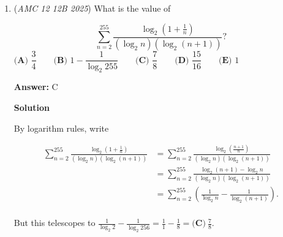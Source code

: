 \begin{enumerate}
 



\textbf{Solution 2 (Trial and Error)}

A number is divisible by $36$ if it divisible by $4$, and $9$. The divisibility rule for $4$ requires the last 2 digits to also be a multiple of $4$. The divisibility rule for 9 requires the sum of all digits to be divisible by $9$. Using the first condition $A+B$ is a multiple of 4. We can list out all possibilities for this, since both $A$ and $B$ are digits. The possibilities are  $(1,2),(1,6),...(9,6)$ for $B$ and $A$ respectively. There are a total of $2$ digits that are $A$'s and $3$ that are $B$'s. So if the digits sum to $9$, then $2A+3B$ is a multiple of 9. We can try plugging in numbers from our list earlier into the equation $2A+3B$ to find what values set the expression equal to a multiple of $9$. By trying numbers $A=6$, and $B=5$. So then $A+B$ yields 

 $6+5=\boxed{\textbf{(C)}~11}$.

 


	\item (\textit{AMC 12 12B 2025}) What is the value of 


 
 \[\sum_{n=2}^{255} \frac{\log_2(1+\frac{1}{n})}{(\log_2 n)(\log_2(n+1))}?\]
$\textbf{(A) } \dfrac{3}{4} \qquad\textbf{(B) } 1-\dfrac{1}{\log_2 255} \qquad\textbf{(C) } \dfrac{7}{8} \qquad\textbf{(D) } \dfrac{15}{16} \qquad\textbf{(E) } 1$

 \textbf{Answer: }C



\textbf{Solution}

By logarithm rules, write

 \begin{align}\sum_{n = 2}^{255}\frac{\log_{2}\left(1 + \frac{1}{n}\right)}{\left(\log_{2}n\right)\left(\log_{2}(n + 1)\right)}&=\sum_{n = 2}^{255}\frac{\log_{2}\left(\frac{n+1}{n}\right)}{\left(\log_{2}n\right)\left(\log_{2}(n + 1)\right)}\\&=\sum_{n = 2}^{255}\frac{\log_{2}(n+1)-\log_{2}n}{\left(\log_{2}n\right)\left(\log_{2}(n + 1)\right)}\\&=\sum_{n = 2}^{255}\left(\frac{1}{\log_{2}n}-\frac{1}{\log_{2}(n+1)}\right).\\\end{align}

 But this telescopes to $\frac{1}{\log_{2}2}-\frac{1}{\log_{2}256}=\frac{1}{1}-\frac{1}{8}=\boxed{\textbf{(C)}~\frac{7}{8}}$.


\end{enumerate}

